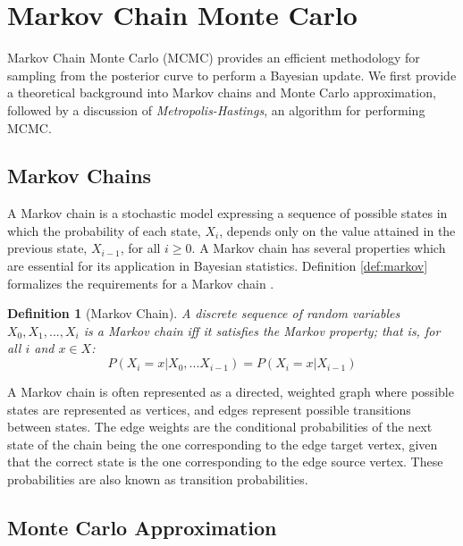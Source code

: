 \documentclass[
  12pt,
]{book}
\theoremstyle{definition}
\newtheorem{definition}{Definition}[chapter]
\theoremstyle{definition}
\theoremstyle{definition}
\theoremstyle{remark}
\begin{document}
\hypertarget{markov-chain-monte-carlo}{%
\section{Markov Chain Monte Carlo}\label{markov-chain-monte-carlo}}

Markov Chain Monte Carlo (MCMC) provides an efficient methodology for sampling from the posterior curve to perform a Bayesian update. We first provide a theoretical background into Markov chains and Monte Carlo approximation, followed by a discussion of \emph{Metropolis-Hastings}, an algorithm for performing MCMC.

\hypertarget{markov-chains}{%
\subsection{Markov Chains}\label{markov-chains}}

A Markov chain is a stochastic model expressing a sequence of possible states in which the probability of each state, \(X_{i}\), depends only on the value attained in the previous state, \(X_{i-1}\), for all \(i \geq 0\).
A Markov chain has several properties which are essential for its application in Bayesian statistics.
Definition \ref{def:markov} formalizes the requirements for a Markov chain \citep{Wasserman2004}.

\begin{definition}[Markov Chain]
\protect\hypertarget{def:markov}{}{\label{def:markov} {} }\emph{A discrete sequence of random variables \({X_{0},X_{1},...,X_{i}}\) is a Markov chain iff it satisfies the Markov property; that is, for all \(i\) and \(x \in X\):}
\[P(X_{i}=x|X_{0},...X_{i-1})=P(X_{i}=x|X_{i-1})\]
\end{definition}

A Markov chain is often represented as a directed, weighted graph where possible states are represented as vertices, and edges represent possible transitions between states. The edge weights are the conditional probabilities of the next state of the chain being the one corresponding to the edge target vertex, given that the correct state is the one corresponding to the edge source vertex. These probabilities are also known as transition probabilities.

\hypertarget{monte-carlo-approximation}{%
\subsection{Monte Carlo Approximation}\label{monte-carlo-approximation}}
\end{document}
